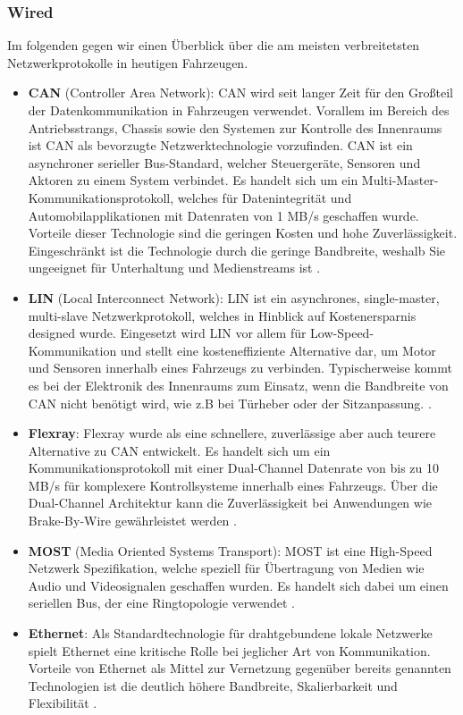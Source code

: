         \subsubsection{Wired}
        Im folgenden gegen wir einen Überblick über die am meisten verbreitetsten Netzwerkprotokolle in heutigen Fahrzeugen. 
            \begin{itemize}
                \item \textbf{CAN} (Controller Area Network): CAN wird seit langer Zeit für den Großteil der Datenkommunikation in Fahrzeugen verwendet.
                Vorallem im Bereich des Antriebsstrangs, Chassis sowie den Systemen zur Kontrolle des Innenraums ist CAN als bevorzugte Netzwerktechnologie vorzufinden.
                CAN ist ein asynchroner serieller Bus-Standard, welcher Steuergeräte, Sensoren und Aktoren zu einem System verbindet. Es handelt sich um ein 
                Multi-Master-Kommunikationsprotokoll, welches für Datenintegrität und Automobilapplikationen mit Datenraten von 1 MB/s geschaffen wurde. Vorteile
                dieser Technologie sind die geringen Kosten und hohe Zuverlässigkeit. Eingeschränkt ist die Technologie durch die geringe Bandbreite, weshalb Sie
                ungeeignet für Unterhaltung und Medienstreams ist \cite{TW_huang2018vehicle}.
                \item \textbf{LIN} (Local Interconnect Network): LIN ist ein asynchrones, single-master, multi-slave Netzwerkprotokoll, welches in Hinblick auf Kostenersparnis 
                designed wurde. Eingesetzt wird LIN vor allem für Low-Speed-Kommunikation und stellt eine kosteneffiziente Alternative dar, um Motor und Sensoren innerhalb 
                eines Fahrzeugs zu verbinden. Typischerweise kommt es bei der Elektronik des Innenraums zum Einsatz, wenn die Bandbreite von CAN nicht benötigt wird, wie z.B bei Türheber
                oder der Sitzanpassung. \cite{TW_huang2018vehicle}.
                \item \textbf{Flexray}: Flexray wurde als eine schnellere, zuverlässige aber auch teurere Alternative zu CAN entwickelt. Es handelt sich um ein Kommunikationsprotokoll mit einer
                Dual-Channel Datenrate von bis zu 10 MB/s für komplexere Kontrollsysteme innerhalb eines Fahrzeugs. Über die Dual-Channel Architektur kann die Zuverlässigkeit
                bei Anwendungen wie Brake-By-Wire gewährleistet werden \cite{TW_huang2018vehicle}. 
                \item \textbf{MOST} (Media Oriented Systems Transport): MOST ist eine High-Speed Netzwerk Spezifikation, welche speziell für Übertragung von Medien wie Audio und Videosignalen 
                geschaffen wurden. Es handelt sich dabei um einen seriellen Bus, der eine Ringtopologie verwendet \cite{TW_huang2018vehicle}.
                \item \textbf{Ethernet}: Als Standardtechnologie für drahtgebundene lokale Netzwerke spielt Ethernet eine kritische Rolle bei jeglicher Art von Kommunikation.
                Vorteile von Ethernet als Mittel zur Vernetzung gegenüber bereits genannten Technologien ist die deutlich höhere Bandbreite, Skalierbarkeit und Flexibilität \cite{IVN}. 
            \end{itemize}

